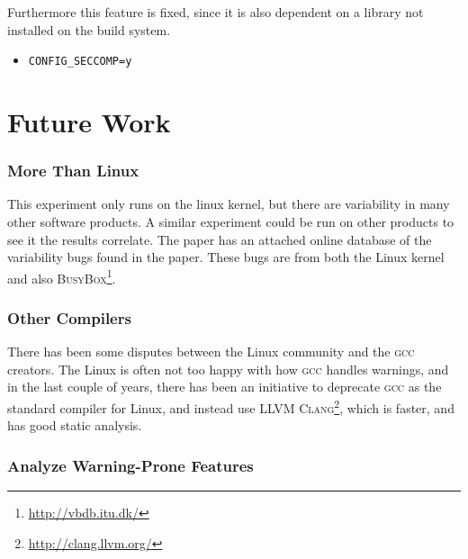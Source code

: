 \documentclass[a4paper,11pt]{report}
\newcommand{\f}{\footnote{\fn}}
\newcommand{\textcode}[1]{\fboxsep=1pt\texttt{\colorbox{gray!20}{#1}}}
\begin{document}
Furthermore this feature is fixed, since it is also dependent on a library not 
installed on the build system.

\begin{itemize}
    \item \textcode{CONFIG\_SECCOMP=y}
\end{itemize}





            \newpage
            \chapter{Future Work}

            \subsection*{More Than Linux}

            \def \fn {\url{http://vbdb.itu.dk/}}

This experiment only runs on the linux kernel, but there are variability in many
other software products. A similar experiment could be run on other products to 
see it the results correlate. The paper \cite{42bugs} has an attached online 
database of the variability bugs found in the paper. These bugs are from both 
the Linux kernel and also \textsc{BusyBox}\f.

            \subsection*{Other Compilers}
            

            \def \fn {\url{http://clang.llvm.org/}}

There has been some disputes between the Linux community and the \textsc{gcc} 
creators\cite{linusgcc}. The Linux is often not too happy with how \textsc{gcc} 
handles warnings, and in the last couple of years, there has been an initiative 
to deprecate \textsc{gcc} as the standard compiler for Linux, and instead use 
\textsc{LLVM Clang}\f, which is faster, and has good static analysis\cite{clang}.


            \subsection*{Analyze Warning-Prone Features}
\end{document}
